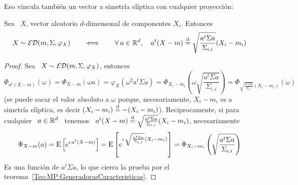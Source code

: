 Eso  v\'incula  tambi\'en  un  vector  a  simetr\'ia  el\'iptica  con  cualquier
proyecci\'on:
%
\begin{teorema}\label{Teo:MP:ProyeccionComponentesEliptica}
  Sea \ $X$, vector aleatorio $d$-dimensonal de componentes $X_i$. Entonces
  \[
  X \sim \mathcal{ED}(m,\Sigma,\varphi_X) \qquad  \Longleftrightarrow \qquad \forall \: a
  \in \mathbb{R}^d, \quad a^t (X - m) \stackrel{\mathrm{d}}{=} \sqrt{\frac{a^t \Sigma a}{\Sigma_{i,i}}}
  (X_i - m_i)
  \]
\end{teorema}
%
\begin{proof}
  Sea \ $X \sim \mathcal{ED}(m,\Sigma,\varphi_X)$, entonces
  \[
  \Phi_{a^t (X - m)}(\omega) = \Phi_{X - m}(\omega a) = \varphi_X\left( \omega^2
    a^t \Sigma  a \right)  = \Phi_{X_i-m_i}\left( \omega  \sqrt{\frac{a^t \Sigma
        a}{\Sigma_{i,i}}}\right)  = \Phi_{\sqrt{\frac{a^t \Sigma
        a}{\Sigma_{i,i}}} (X_i-m_i)}\left( \omega  \right)
  \]
  (se puede sacar el valor absoluto a $\omega$ porque, necesariamente, $X_i-m_i$
  es     a     simetr\'ia    el\'iptica,     es     decir    $(X_i-m_i)     \stackrel{\mathrm{d}}{=}
  -(X_i-m_i)$). Reciprocamente, si para cualquier  \ $a \in \mathbb{R}^d$ \ tenemos \
  $a^t (X  - m)  \stackrel{\mathrm{d}}{=} \sqrt{\frac{a^t \Sigma  a}{\Sigma_{i,i}}} (X_i  - m_i)$,
  necesariamente
  \[
  \Phi_{X  - m}(a) =  \operatorname{E}\left[ e^{\imath  \, a^t  (X-m)} \right]  = \operatorname{E}\left[
    e^{\imath \, \sqrt{\frac{a^t \Sigma a}{\Sigma_{i,i}}} (X_i - m_i)} \right] =
  \Phi_{X_i-m_i}\left( \sqrt{\frac{a^t \Sigma a}{\Sigma_{i,i}}}\right)
  \]
  Es  una  funci\'on  de  $a^t  \Sigma  a$,  lo que  cierra  la  prueba  por  el
  teorema~\ref{Teo:MP:GeneradorasCaracteristicas}.
\end{proof}

